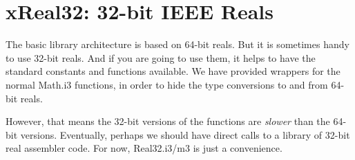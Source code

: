 \section{xReal32: 32-bit IEEE Reals}

The basic library architecture is based on 64-bit reals.  But it
is sometimes handy to use 32-bit reals.  And if you are going to use
them, it helps to have the standard constants and functions
available.  We have provided wrappers for the normal Math.i3 functions,
in order to hide the type conversions to and from 64-bit reals.

However, that means the 32-bit versions of the functions
are {\em slower} than the 64-bit versions.  Eventually, perhaps
we should have direct calls to a library of 32-bit real assembler
code.  For now, Real32.i3/m3 is just a convenience.
